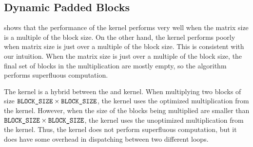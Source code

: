 \subsection{Dynamic Padded Blocks}
 shows that the performance of the 
kernel performs very well when the matrix size is a multiple of the block size.
On the other hand, the kernel performs poorly when matrix size is just over a
multiple of the block size. This is consistent with our intuition. When the
matrix size is just over a multiple of the block size, the final set of blocks
in the multiplication are mostly empty, so the algorithm performs superfluous
computation.

The  kernel is a hybrid between the  and
 kernel. When multiplying two blocks of size
$\texttt{BLOCK\_SIZE} \times \texttt{BLOCK\_SIZE}$, the kernel uses the optimized
multiplication from the  kernel. However, when the size of
the blocks being multiplied are smaller than $\texttt{BLOCK\_SIZE} \times
\texttt{BLOCK\_SIZE}$, the kernel uses the unoptimized multiplication from the
 kernel. Thus, the  kernel does not perform
superfluous computation, but it does have some overhead in dispatching between
two different loops.
